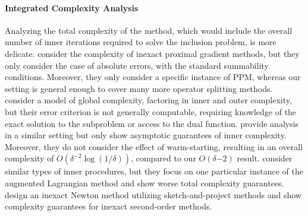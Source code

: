 \documentclass[11pt]{article}
\begin{document}
\paragraph{Integrated Complexity Analysis}
Analyzing the total complexity of the method, which would include the overall number of inner iterations required to solve the inclusion problem, is more delicate.
\citet{machart2012optimalcomputationaltradeoffinexact} consider the complexity of inexact proximal gradient methods, but they only consider the case of absolute errors, with the standard summability conditions.
Moreover, they only consider a specific instance of PPM, whereas our setting is general enough to cover many more operator splitting methods.
\citet{LinMairal2018CatalystAcceleration} consider a model of global complexity, factoring in inner and outer complexity, but their error criterion is not generally computable, requiring knowledge of the exact solution to the subproblem or access to the dual function.
\citet[Theorems 4.3 and 4.4]{alves2017iterationcomplexityinexactdouglasrachford} provide analysis in a similar setting but only show asymptotic guarantees of inner complexity.
Moreover, they do not consider the effect of warm-starting, resulting in an overall complexity of $O(\delta^{-2}\log(1/\delta))$, compared to our $O(\delta{-2})$ result.
\citet{liInexactProximalAugmented2021} consider similar types of inner procedures, but they focus on one particular instance of the augmented Lagrangian method and show worse total complexity guarantees.
\citet{du2026inferencenewtonmethodsaccelerated} design an inexact Newton method utilizing sketch-and-project methods and show complexity guarantees for inexact second-order methods.
\end{document}
